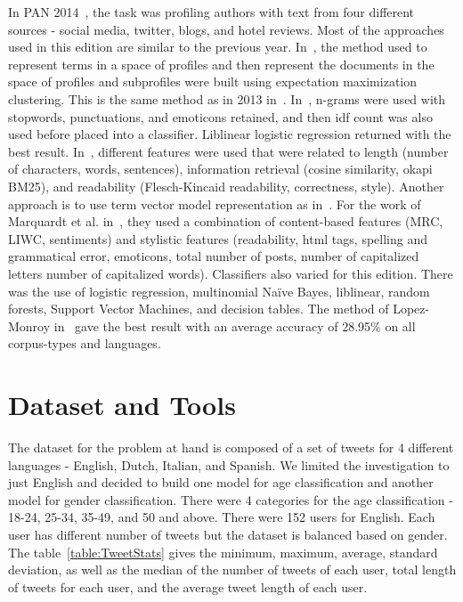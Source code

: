 \documentclass[a4paper]{llncs}
\begin{document}
In PAN 2014~\cite{rangel2014overview}, the task was profiling authors with text from four different sources - social media, twitter, blogs, and hotel reviews. Most of the approaches used in this edition are similar to the previous year. In~\cite{lopezusing}, the method used to represent terms in a space of profiles and then represent the documents in the space of profiles and subprofiles were built using expectation maximization clustering. This is the same method as in 2013 in~\cite{lopez2013inaoe}. In~\cite{maharjansimple}, n-grams were used with stopwords, punctuations, and emoticons retained, and then idf count was also used before placed into a classifier. Liblinear logistic regression returned with the best result. In~\cite{weren6exploring}, different features were used that were related to length (number of characters, words, sentences), information retrieval (cosine similarity, okapi BM25), and readability (Flesch-Kincaid readability, correctness, style). Another approach is to use term vector model representation as in~\cite{villenadaedalus}. For the work of Marquardt et al. in~\cite{marquardt2014age}, they used a combination of content-based features (MRC, LIWC, sentiments) and stylistic features (readability, html tags, spelling and grammatical error, emoticons, total number of posts, number of capitalized letters number of capitalized words). Classifiers also varied for this edition. There was the use of logistic regression, multinomial Naïve Bayes, liblinear, random forests, Support Vector Machines, and decision tables. The method of Lopez-Monroy in~\cite{lopezusing} gave the best result with an average accuracy of 28.95\% on all corpus-types and languages. 

\section{Dataset and Tools}
The dataset for the problem at hand is composed of a set of tweets for 4 different languages - English, Dutch, Italian, and Spanish. We limited the investigation to just English and decided to build one model for age classification and another model for gender classification. There were 4 categories for the age classification - 18-24, 25-34, 35-49, and 50 and above. There were 152 users for English. Each user has different number of tweets but the dataset is balanced based on gender. The table~\ref{table:TweetStats} gives the minimum, maximum, average, standard deviation, as well as the median of the number of tweets of each user, total length of tweets for each user, and the average tweet length of each user. 
\end{document}
